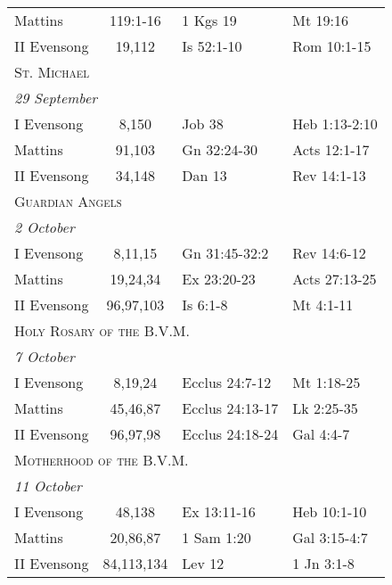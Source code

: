 \begin{longtable}{l c l l}
\hspace{1em} Mattins&119:1-16&1 Kgs 19&Mt 19:16\\
\hspace{1em} II Evensong&19,112&Is 52:1-10&Rom 10:1-15\\
\multicolumn{4}{l}{\textsc{St. Michael}}\\
\multicolumn{4}{l}{\textit{29 September}}\\
\hspace{1em} I Evensong&8,150&Job 38&Heb 1:13-2:10\\
\hspace{1em} Mattins&91,103&Gn 32:24-30&Acts 12:1-17\\
\hspace{1em} II Evensong&34,148&Dan 13&Rev 14:1-13\\
%
\multicolumn{4}{l}{\textsc{Guardian Angels}}\\
\multicolumn{4}{l}{\textit{2 October}}\\
\hspace{1em} I Evensong&8,11,15&Gn 31:45-32:2&Rev 14:6-12\\
\hspace{1em} Mattins&19,24,34&Ex 23:20-23&Acts 27:13-25\\
\hspace{1em} II Evensong&96,97,103&Is 6:1-8&Mt 4:1-11\\
%
\multicolumn{4}{l}{\textsc{Holy Rosary of the B.V.M.}}\\
\multicolumn{4}{l}{\textit{7 October}}\\
\hspace{1em} I Evensong&8,19,24&Ecclus 24:7-12&Mt 1:18-25\\
\hspace{1em} Mattins&45,46,87&Ecclus 24:13-17&Lk 2:25-35\\
\hspace{1em} II Evensong&96,97,98&Ecclus 24:18-24&Gal 4:4-7\\
%
\multicolumn{4}{l}{\textsc{Motherhood of the B.V.M.}}\\
\multicolumn{4}{l}{\textit{11 October}}\\
\hspace{1em} I Evensong&48,138&Ex 13:11-16&Heb 10:1-10\\
\hspace{1em} Mattins&20,86,87&1 Sam 1:20&Gal 3:15-4:7\\
\hspace{1em} II Evensong&84,113,134&Lev 12&1 Jn 3:1-8\\

\end{longtable}
